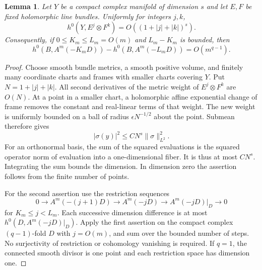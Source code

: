 \documentclass[11pt]{article}
\newtheorem{lemma}{Lemma}
\begin{document}
\begin{lemma}\label{lem:dimension}
Let $Y$ be a compact complex manifold of dimension $s$ and let $E,F$ be
fixed holomorphic line bundles. Uniformly for integers $j,k$,
\[
 h^0(Y,E^j\otimes F^k)=O((1+|j|+|k|)^s).
\]
Consequently, if $0\leq K_m\leq L_m=O(m)$ and $L_m-K_m$ is bounded, then
\[
 h^0(B,A^m(-K_mD))-h^0(B,A^m(-L_mD))=O(m^{q-1}).
\]
\end{lemma}
\begin{proof}
Choose smooth bundle metrics, a smooth positive volume, and finitely many
coordinate charts and frames with smaller charts covering $Y$. Put
$N=1+|j|+|k|$. All second derivatives of the metric weight of
$E^j\otimes F^k$ are $O(N)$. At a point in a smaller chart, a holomorphic
affine exponential change of frame removes the constant and real-linear
terms of that weight. The new weight is uniformly bounded on a ball of
radius $\epsilon N^{-1/2}$ about the point. Submean therefore gives
\[
 |\sigma(y)|^2\leq C N^s\|\sigma\|_{L^2}^2.
\]
For an orthonormal basis, the sum of the squared evaluations is the squared
operator norm of evaluation into a one-dimensional fiber. It is thus at
most $CN^s$. Integrating the sum bounds the dimension. In dimension zero
the assertion follows from the finite number of points.

For the second assertion use the restriction sequences
\[
 0\longrightarrow A^m(-(j+1)D)\longrightarrow A^m(-jD)
 \longrightarrow A^m(-jD)|_D\longrightarrow0
\]
for $K_m\leq j<L_m$. Each successive dimension difference is at most
$h^0(D,A^m(-jD)|_D)$. Apply the first assertion on the compact complex
$(q-1)$-fold $D$ with $j=O(m)$, and sum over the bounded number of steps.
No surjectivity of restriction or cohomology vanishing is required. If
$q=1$, the connected smooth divisor is one point and each restriction space
has dimension one.
\end{proof}
\end{document}
